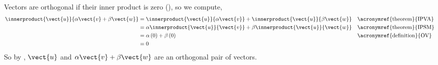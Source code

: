 Vectors are orthogonal if their inner product is zero (), so we compute,
%
\begin{align*}
\innerproduct{\vect{u}}{\alpha\vect{v}+\beta\vect{w}}
&=
\innerproduct{\vect{u}}{\alpha\vect{v}}+
\innerproduct{\vect{u}}{\beta\vect{w}}
&&\text{\acronymref{theorem}{IPVA}}\\
%
&=
\alpha\innerproduct{\vect{u}}{\vect{v}}+
\beta\innerproduct{\vect{u}}{\vect{w}}
&&\text{\acronymref{theorem}{IPSM}}\\
%
&=
\alpha\left(0\right)+\beta\left(0\right)
&&\text{\acronymref{definition}{OV}}\\
%
&=0
\end{align*}
%
So by , $\vect{u}$ and $\alpha\vect{v}+\beta\vect{w}$ are an orthogonal pair of vectors.